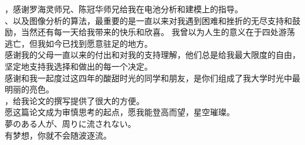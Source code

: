 \begin{acknowledgement}
\begin{quote}
  \end{quote}
  \indent
  ，感谢罗海灵师兄、陈冠华师兄给我在电池分析和建模上的指导。\\
  、以及图像分析的算法，最重要的是一直以来对我遇到困难和挫折的无尽支持和鼓励，当然还有每一天给我带来的快乐和欣喜。 我曾以为人生的意义在于四处游荡逃亡，但我如今已找到愿意驻足的地方。
  \\
  \indent 感谢我的父母一直以来的付出和对我的支持理解，他们总是给我最大限度的自由，坚定地支持我选择和做出的每一个决定。
  \\
  \indent 感谢和我一起度过这四年的酸甜时光的同学和朋友，是你们组成了我大学时光中最明丽的亮色。
  \\
  ，给我论文的撰写提供了很大的方便。
  \\
  \indent 愿这篇论文成为审慎思考的起点，愿我能登高而望，星空璀璨。
  \\
  \indent 夢のある人が、周りに流されない。
  \\
  \indent 有梦想，你就不会随波逐流。
  \end{acknowledgement}
